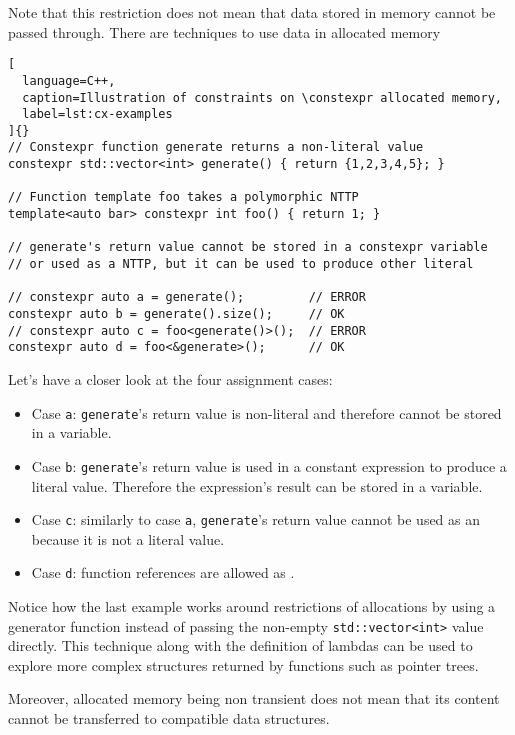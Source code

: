 \documentclass[../../main]{subfiles}
\begin{document}
Note that this restriction does not mean that data stored in \constexpr memory
cannot be passed through. There are techniques to use data in \constexpr
allocated memory

\begin{lstlisting}[
  language=C++,
  caption=Illustration of constraints on \constexpr allocated memory,
  label=lst:cx-examples
]{}
// Constexpr function generate returns a non-literal value
constexpr std::vector<int> generate() { return {1,2,3,4,5}; }

// Function template foo takes a polymorphic NTTP
template<auto bar> constexpr int foo() { return 1; }

// generate's return value cannot be stored in a constexpr variable
// or used as a NTTP, but it can be used to produce other literal

// constexpr auto a = generate();         // ERROR
constexpr auto b = generate().size();     // OK
// constexpr auto c = foo<generate()>();  // ERROR
constexpr auto d = foo<&generate>();      // OK
\end{lstlisting}

Let's have a closer look at the four assignment cases:

\begin{itemize}
\item Case \lstinline{a}: \lstinline{generate}'s return value is non-literal
      and therefore cannot be stored in a \constexpr variable.
\item Case \lstinline{b}: \lstinline{generate}'s return value is used in a
      constant expression to produce a literal value.
      Therefore the expression's result can be stored in a \constexpr variable.
\item Case \lstinline{c}: similarly to case \lstinline{a},
      \lstinline{generate}'s return value cannot be used as an \nttp because it
      is not a literal value.
\item Case \lstinline{d}: function references are allowed as \nttps.
\end{itemize}

Notice how the last example works around restrictions of \constexpr allocations
by using a generator function instead of passing the non-empty
\lstinline{std::vector<int>} value directly. This technique along with the
definition of lambdas can be used to explore more complex structures returned by
\constexpr functions such as pointer trees.

Moreover, \constexpr allocated memory being non transient does not mean that its
content cannot be transferred to \nttp compatible data structures.
\end{document}
